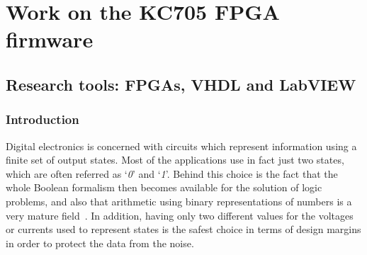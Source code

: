 \part{Work on the KC705 FPGA firmware}

\chapter{Research tools: FPGAs, VHDL and LabVIEW}
\section{Introduction}
\noindent Digital electronics is concerned with circuits which represent information using a finite set of output
states. Most of the applications use in fact just two states, which are often referred as ‘\textit{0}’ and ‘\textit{1}’.
Behind this choice is the fact that the whole Boolean formalism then becomes available for the
solution of logic problems, and also that arithmetic using binary representations of numbers is a very
mature field~\cite{fpga1}.
\newline
In addition, having only two different values for the voltages or currents used to represent states is the safest choice in terms of
design margins in order to protect the data from the noise.



